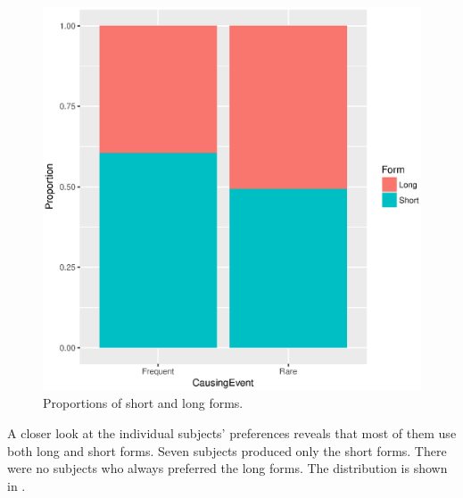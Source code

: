 \documentclass[output=paper]{langsci/langscibook}
\begin{document}
  

\begin{figure}
\includegraphics[height=.45\textheight]{figures/Figure3.eps}

\caption{Proportions of short and long forms.}
\label{fig:levshina:3}
\end{figure}

A closer look at the individual subjects’ preferences reveals that most of them use both long and short forms. Seven subjects produced only the short forms. There were no subjects who always preferred the long forms. The distribution is shown in . 
\end{document}
